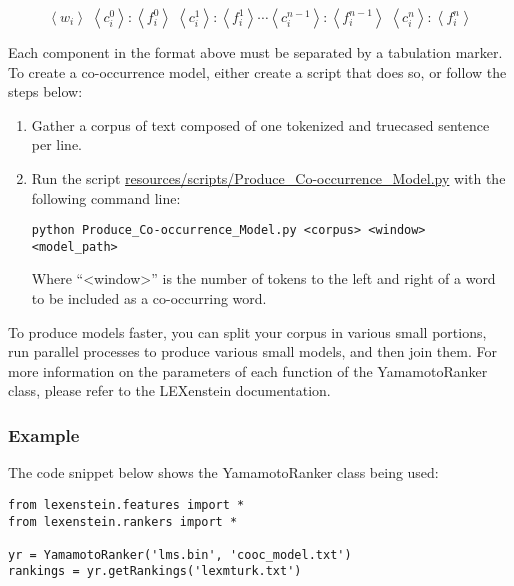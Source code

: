 \begin{equation}
\label{cooc}
\left\langle w_{i} \right\rangle\; \left\langle c_{i}^{0} \right\rangle\!:\!\left\langle f_{i}^{0} \right\rangle\;\left\langle c_{i}^{1} \right\rangle\!:\!\left\langle f_{i}^{1} \right\rangle\cdots\left\langle c_{i}^{n-1} \right\rangle\!:\!\left\langle f_{i}^{n-1} \right\rangle \; \left\langle c_{i}^{n} \right\rangle\!:\!\left\langle f_{i}^{n} \right\rangle
\end{equation}

Each component in the format above must be separated by a tabulation marker. To create a co-occurrence model, either create a script that does so, or follow the steps below:

\begin{enumerate}
\item Gather a corpus of text composed of one tokenized and truecased sentence per line.
\item Run the script \url{resources/scripts/Produce_Co-occurrence_Model.py} with the following command line:

\begin{lstlisting}
python Produce_Co-occurrence_Model.py <corpus> <window> <model_path>
\end{lstlisting}

Where ``<window>'' is the number of tokens to the left and right of a word to be included as a co-occurring word.

\end{enumerate}

To produce models faster, you can split your corpus in various small portions, run parallel processes to produce various small models, and then join them. For more information on the parameters of each function of the YamamotoRanker class, please refer to the LEXenstein documentation.

\subsubsection{Example}

The code snippet below shows the YamamotoRanker class being used:

\begin{lstlisting}
from lexenstein.features import *
from lexenstein.rankers import *

yr = YamamotoRanker('lms.bin', 'cooc_model.txt')
rankings = yr.getRankings('lexmturk.txt')
\end{lstlisting}















